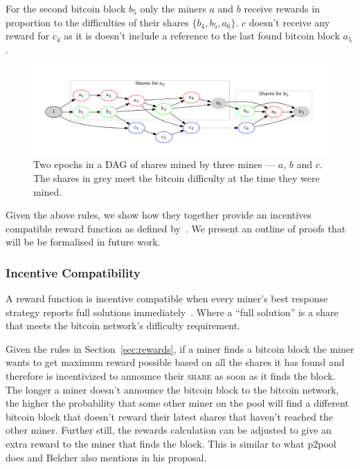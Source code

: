 \documentclass{article}
\begin{document}
For the second bitcoin block $b_5$ only the miners $a$ and $b$ receive
rewards in proportion to the difficulties of their shares
$\{b_4, b_5, a_6\}$. $c$ doesn't receive any reward for $c_4$ as it is
doesn't include a reference to the last found bitcoin block $a_5$.

\begin{figure}
  \begin{center}
    \includegraphics[width=1.0\textwidth]{shares-dag}
    \caption{Two epochs in a DAG of shares mined by three mines ---
      $a$, $b$ and $c$. The shares in grey meet the bitcoin difficulty
      at the time they were mined.}\label{fig:shares-dag}
  \end{center}
\end{figure}

Given the above rules, we show how they together provide an incentives
compatible reward function as defined
by~\cite{incentives-compatible}. We present an outline of proofs that
will be be formalised in future work.

\subsubsection{Incentive Compatibility}\label{sec:incentive-compatability}

A reward function is incentive compatible when every miner's best
response strategy reports full solutions
immediately~\cite{incentives-compatible}. Where a ``full solution'' is
a share that meets the bitcoin network's difficulty requirement.

Given the rules in Section~\ref{sec:rewards}, if a miner finds a
bitcoin block the miner wants to get maximum reward possible based on
all the shares it has found and therefore is incentivized to announce
their \textsc{share} as soon as it finds the block. The longer a miner
doesn't announce the bitcoin block to the bitcoin network, the higher
the probability that some other miner on the pool will find a
different bitcoin block that doesn't reward their latest shares that
haven't reached the other miner. Further still, the rewards
calculation can be adjusted to give an extra reward to the miner that
finds the block. This is similar to what p2pool does and Belcher also
mentions in his proposal.
\end{document}
